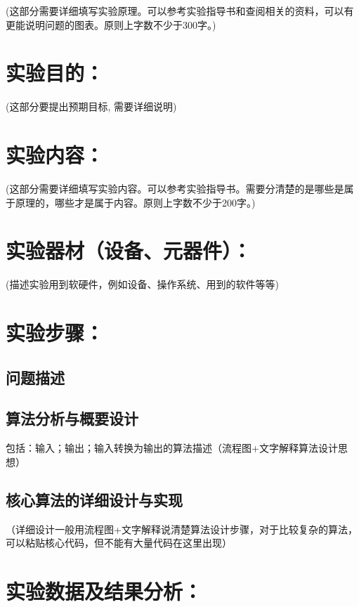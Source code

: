 \documentclass[a4paper,11pt,UTF8,AutoFakeBold]{ctexart}
\begin{document}
(这部分需要详细填写实验原理。可以参考实验指导书和查阅相关的资料，可以有更能说明问题的图表。原则上字数不少于300字。)\\


\section{实验目的：}

(这部分要提出预期目标, 需要详细说明)\\

\section{实验内容：}

(这部分需要详细填写实验内容。可以参考实验指导书。需要分清楚的是哪些是属于原理的，哪些才是属于内容。原则上字数不少于200字。)\\

\section{实验器材（设备、元器件）：}

(描述实验用到软硬件，例如设备、操作系统、用到的软件等等)\\

\section{实验步骤：}

\subsection{问题描述}
\subsection{算法分析与概要设计}
包括：输入；输出；输入转换为输出的算法描述（流程图+文字解释算法设计思想）
\subsection{核心算法的详细设计与实现}
（详细设计一般用流程图+文字解释说清楚算法设计步骤，对于比较复杂的算法，可以粘贴核心代码，但不能有大量代码在这里出现）


\section{实验数据及结果分析：}
\end{document}
